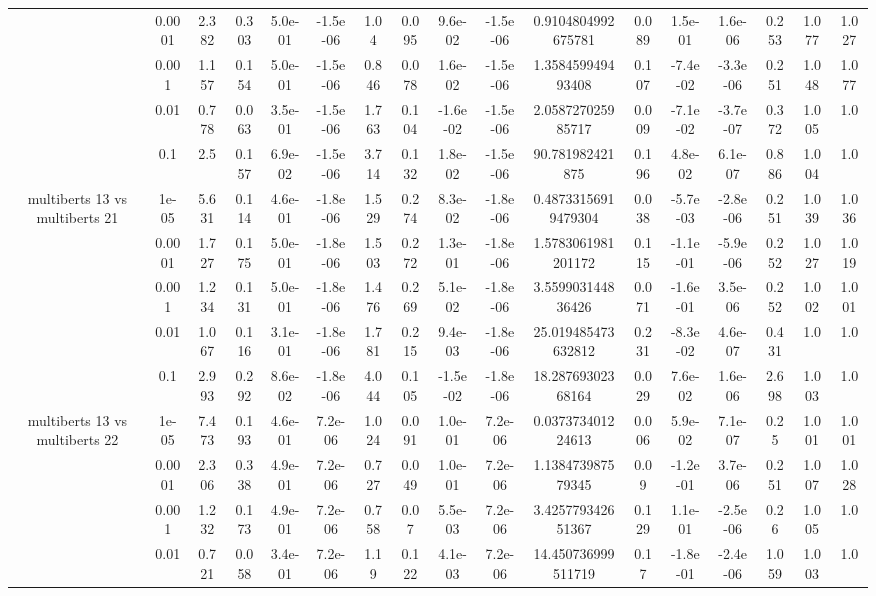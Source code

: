 \begin{tabular}{|c|c|c|c|c|c|c|c|c|c|c|c|c|c|c|c|c|}
 & 0.0001 & 2.382 & 0.303 & 5.0e-01 & -1.5e-06 & 1.04 & 0.095 & 9.6e-02 & -1.5e-06 & 0.9104804992675781 & 0.089 & 1.5e-01 & 1.6e-06 & 0.253 & 1.077 & 1.027 \\
 & 0.001 & 1.157 & 0.154 & 5.0e-01 & -1.5e-06 & 0.846 & 0.078 & 1.6e-02 & -1.5e-06 & 1.358459949493408 & 0.107 & -7.4e-02 & -3.3e-06 & 0.251 & 1.048 & 1.077 \\
 & 0.01 & 0.778 & 0.063 & 3.5e-01 & -1.5e-06 & 1.763 & 0.104 & -1.6e-02 & -1.5e-06 & 2.058727025985717 & 0.009 & -7.1e-02 & -3.7e-07 & 0.372 & 1.005 & 1.0 \\
 & 0.1 & 2.5 & 0.157 & 6.9e-02 & -1.5e-06 & 3.714 & 0.132 & 1.8e-02 & -1.5e-06 & 90.781982421875 & 0.196 & 4.8e-02 & 6.1e-07 & 0.886 & 1.004 & 1.0 \\
\hline
\multirow{5}{*}{multiberts 13 vs multiberts 21} & 1e-05 & 5.631 & 0.114 & 4.6e-01 & -1.8e-06 & 1.529 & 0.274 & 8.3e-02 & -1.8e-06 & 0.48733156919479304 & 0.038 & -5.7e-03 & -2.8e-06 & 0.251 & 1.039 & 1.036 \\
 & 0.0001 & 1.727 & 0.175 & 5.0e-01 & -1.8e-06 & 1.503 & 0.272 & 1.3e-01 & -1.8e-06 & 1.5783061981201172 & 0.115 & -1.1e-01 & -5.9e-06 & 0.252 & 1.027 & 1.019 \\
 & 0.001 & 1.234 & 0.131 & 5.0e-01 & -1.8e-06 & 1.476 & 0.269 & 5.1e-02 & -1.8e-06 & 3.559903144836426 & 0.071 & -1.6e-01 & 3.5e-06 & 0.252 & 1.002 & 1.001 \\
 & 0.01 & 1.067 & 0.116 & 3.1e-01 & -1.8e-06 & 1.781 & 0.215 & 9.4e-03 & -1.8e-06 & 25.019485473632812 & 0.231 & -8.3e-02 & 4.6e-07 & 0.431 & 1.0 & 1.0 \\
 & 0.1 & 2.993 & 0.292 & 8.6e-02 & -1.8e-06 & 4.044 & 0.105 & -1.5e-02 & -1.8e-06 & 18.28769302368164 & 0.029 & 7.6e-02 & 1.6e-06 & 2.698 & 1.003 & 1.0 \\
\hline
\multirow{5}{*}{multiberts 13 vs multiberts 22} & 1e-05 & 7.473 & 0.193 & 4.6e-01 & 7.2e-06 & 1.024 & 0.091 & 1.0e-01 & 7.2e-06 & 0.037373401224613 & 0.006 & 5.9e-02 & 7.1e-07 & 0.25 & 1.001 & 1.001 \\
 & 0.0001 & 2.306 & 0.338 & 4.9e-01 & 7.2e-06 & 0.727 & 0.049 & 1.0e-01 & 7.2e-06 & 1.138473987579345 & 0.09 & -1.2e-01 & 3.7e-06 & 0.251 & 1.007 & 1.028 \\
 & 0.001 & 1.232 & 0.173 & 4.9e-01 & 7.2e-06 & 0.758 & 0.07 & 5.5e-03 & 7.2e-06 & 3.425779342651367 & 0.129 & 1.1e-01 & -2.5e-06 & 0.26 & 1.005 & 1.0 \\
 & 0.01 & 0.721 & 0.058 & 3.4e-01 & 7.2e-06 & 1.19 & 0.122 & 4.1e-03 & 7.2e-06 & 14.450736999511719 & 0.17 & -1.8e-01 & -2.4e-06 & 1.059 & 1.003 & 1.0 \\

\end{tabular}
